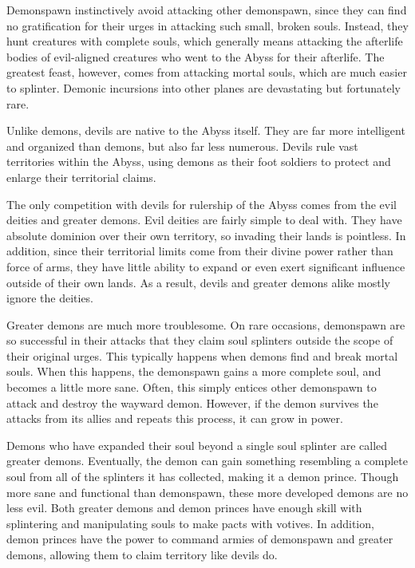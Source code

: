       Demonspawn instinctively avoid attacking other demonspawn, since they can find no gratification for their urges in attacking such small, broken souls.
      Instead, they hunt creatures with complete souls, which generally means attacking the afterlife bodies of evil-aligned creatures who went to the Abyss for their afterlife.
      The greatest feast, however, comes from attacking mortal souls, which are much easier to splinter.
      Demonic incursions into other planes are devastating but fortunately rare.

      Unlike demons, devils are native to the Abyss itself.
      They are far more intelligent and organized than demons, but also far less numerous.
      Devils rule vast territories within the Abyss, using demons as their foot soldiers to protect and enlarge their territorial claims.

      The only competition with devils for rulership of the Abyss comes from the evil deities and greater demons.
      Evil deities are fairly simple to deal with.
      They have absolute dominion over their own territory, so invading their lands is pointless.
      In addition, since their territorial limits come from their divine power rather than force of arms, they have little ability to expand or even exert significant influence outside of their own lands.
      As a result, devils and greater demons alike mostly ignore the deities.

      Greater demons are much more troublesome.
      On rare occasions, demonspawn are so successful in their attacks that they claim soul splinters outside the scope of their original urges.
      This typically happens when demons find and break mortal souls.
      When this happens, the demonspawn gains a more complete soul, and becomes a little more sane.
      Often, this simply entices other demonspawn to attack and destroy the wayward demon.
      However, if the demon survives the attacks from its allies and repeats this process, it can grow in power.

      Demons who have expanded their soul beyond a single soul splinter are called greater demons.
      Eventually, the demon can gain something resembling a complete soul from all of the splinters it has collected, making it a demon prince.
      Though more sane and functional than demonspawn, these more developed demons are no less evil.
      Both greater demons and demon princes have enough skill with splintering and manipulating souls to make pacts with votives.
      In addition, demon princes have the power to command armies of demonspawn and greater demons, allowing them to claim territory like devils do.

